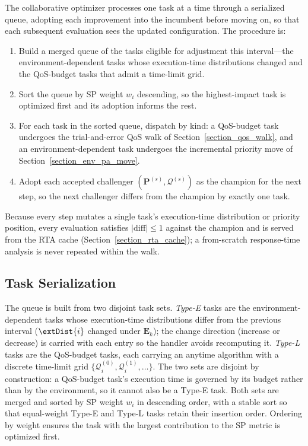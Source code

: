     The collaborative optimizer processes one task at a time through a serialized queue, adopting each improvement into the incumbent before moving on, so that each subsequent evaluation sees the updated configuration.
    The procedure is:
    \begin{enumerate}
        \item Build a merged queue of the tasks eligible for adjustment this interval---the environment-dependent tasks whose execution-time distributions changed and the QoS-budget tasks that admit a time-limit grid.
        \item Sort the queue by SP weight $w_i$ descending, so the highest-impact task is optimized first and its adoption informs the rest.
        \item For each task in the sorted queue, dispatch by kind: a QoS-budget task undergoes the trial-and-error QoS walk of Section~\ref{section_qos_walk}, and an environment-dependent task undergoes the incremental priority move of Section~\ref{section_env_pa_move}.
        \item Adopt each accepted challenger $(\boldsymbol{P}^{(s)},\boldsymbol{\mathcal{Q}}^{(s)})$ as the champion for the next step, so the next challenger differs from the champion by exactly one task.
    \end{enumerate}
    Because every step mutates a single task's execution-time distribution or priority position, every evaluation satisfies $|\mathrm{diff}| \leq 1$ against the champion and is served from the RTA cache (Section~\ref{section_rta_cache}); a from-scratch response-time analysis is never repeated within the walk.

    \subsection{Task Serialization}
    \label{section_task_serialization}

    The queue is built from two disjoint task sets.
    \textit{Type-E} tasks are the environment-dependent tasks whose execution-time distributions differ from the previous interval ($\extDist{i}$ changed under $\textbf{E}_k$); the change direction (increase or decrease) is carried with each entry so the handler avoids recomputing it.
    \textit{Type-L} tasks are the QoS-budget tasks, each carrying an anytime algorithm with a discrete time-limit grid $\{\mathcal{Q}_i^{(0)}, \mathcal{Q}_i^{(1)}, \dots\}$.
    The two sets are disjoint by construction: a QoS-budget task's execution time is governed by its budget rather than by the environment, so it cannot also be a Type-E task.
    Both sets are merged and sorted by SP weight $w_i$ in descending order, with a stable sort so that equal-weight Type-E and Type-L tasks retain their insertion order.
    Ordering by weight ensures the task with the largest contribution to the SP metric is optimized first.

